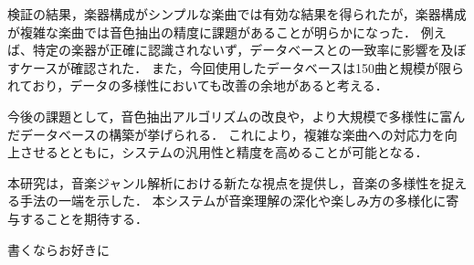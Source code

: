 検証の結果，楽器構成がシンプルな楽曲では有効な結果を得られたが，楽器構成が複雑な楽曲では音色抽出の精度に課題があることが明らかになった．
例えば、特定の楽器が正確に認識されないず，データベースとの一致率に影響を及ぼすケースが確認された．
また，今回使用したデータベースは150曲と規模が限られており，データの多様性においても改善の余地があると考える．

今後の課題として，音色抽出アルゴリズムの改良や，より大規模で多様性に富んだデータベースの構築が挙げられる．
これにより，複雑な楽曲への対応力を向上させるとともに，システムの汎用性と精度を高めることが可能となる．

本研究は，音楽ジャンル解析における新たな視点を提供し，音楽の多様性を捉える手法の一端を示した．
本システムが音楽理解の深化や楽しみ方の多様化に寄与することを期待する． 



\begin{acknowledgment}
    書くならお好きに
\end{acknowledgment}

